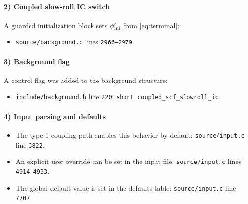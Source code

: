 \documentclass[aps,onecolumn,prd,nofootinbib,superscriptaddress,10pt,longbibliography,floatfix]{revtex4-2}
\begin{document}
\paragraph{2) Coupled slow-roll IC switch}
A guarded initialization block sets $\phi'_{\rm ini}$ from \cref{eq:terminal}:
\begin{itemize}
\item \texttt{source/background.c} lines \texttt{2966--2979}.
\end{itemize}

\paragraph{3) Background flag}
A control flag was added to the background structure:
\begin{itemize}
\item \texttt{include/background.h} line \texttt{220}: \texttt{short coupled\_scf\_slowroll\_ic}.
\end{itemize}

\paragraph{4) Input parsing and defaults}
\begin{itemize}
\item The type-1 coupling path enables this behavior by default:
\texttt{source/input.c} line \texttt{3822}.
\item An explicit user override can be set in the input file:
\texttt{source/input.c} lines \texttt{4914--4933}.
\item The global default value is set in the defaults table:
\texttt{source/input.c} line \texttt{7707}.
\end{itemize}
\end{document}
